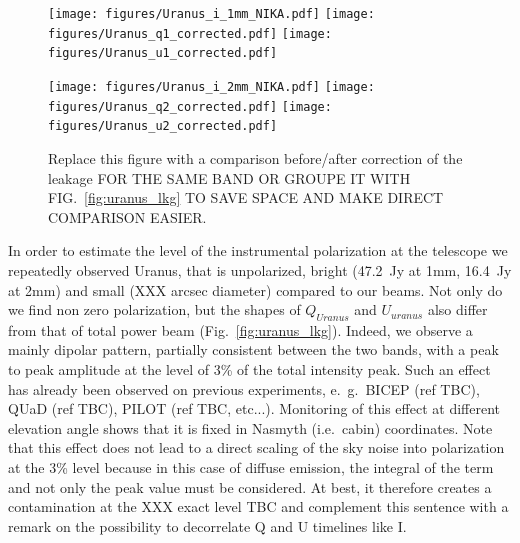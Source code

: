 \documentclass[twocolumn,traditabstract]{aa}
\begin{document}
{\begin{figure}
  \begin{center}
    \texttt{[image: figures/Uranus\_i\_1mm\_NIKA.pdf]}
    \texttt{[image: figures/Uranus\_q1\_corrected.pdf]}
    \texttt{[image: figures/Uranus\_u1\_corrected.pdf]}
  \end{center}
\end{figure}

\begin{figure}
  \begin{center}
    \texttt{[image: figures/Uranus\_i\_2mm\_NIKA.pdf]}
    \texttt{[image: figures/Uranus\_q2\_corrected.pdf]}
    \texttt{[image: figures/Uranus\_u2\_corrected.pdf]}
\caption{ {\color{red} Replace this figure with a comparison before/after
    correction of the leakage FOR THE SAME BAND OR GROUPE IT WITH
    FIG.~\ref{fig:uranus_lkg} TO SAVE SPACE AND MAKE DIRECT COMPARISON EASIER. }}

    \label{Uranus_corrected}
  \end{center}
\end{figure}


In order to estimate the level of the instrumental polarization at the telescope
we repeatedly observed Uranus, that is unpolarized, bright (47.2~Jy at 1mm,
16.4~Jy at 2mm) and small ({\color{Red}XXX arcsec diameter}) compared to our
beams. Not only do we find non zero polarization, but the shapes of $Q_{Uranus}$
and $U_{uranus}$ also differ from that of total power beam
(Fig.~\ref{fig:uranus_lkg}). Indeed, we observe a mainly dipolar pattern,
partially consistent between the two bands, with a peak to peak amplitude at the
level of 3\% of the total intensity peak. Such an effect has already been
observed on previous experiments, e.~g.~BICEP ({\color{red}ref TBC}), QUaD
({\color{red}ref TBC}), PILOT ({\color{red}ref TBC, etc...}). Monitoring of this
effect at different elevation angle shows that it is fixed in Nasmyth
(i.e.~cabin) coordinates. Note that this effect does not lead to a direct
scaling of the sky noise into polarization at the 3\% level because in this
case of diffuse emission, the integral of the term and not only the peak value
must be considered. At best, it therefore creates a contamination at the
{\color{red} XXX exact level TBC and complement this sentence with a remark on
  the possibility to decorrelate Q and U timelines like I.}

}
\end{document}
